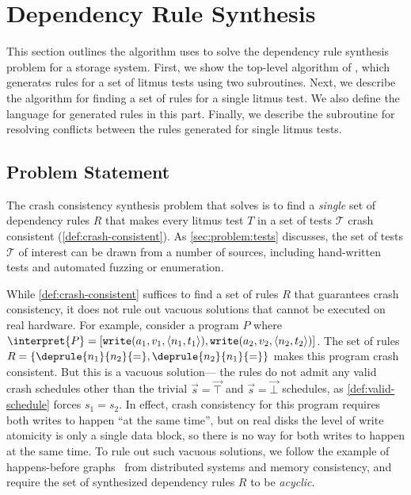 
\section{Dependency Rule Synthesis}
\label{s:algorithm}


This section outlines the algorithm \depsynth uses to solve the dependency rule
synthesis problem for a storage system.
First, we show the top-level algorithm of \depsynth, which generates rules
for a set of litmus tests using two subroutines.
Next, we describe the algorithm for finding a set of rules for a single litmus test.
We also define the language for generated rules in this part.
Finally, we describe the subroutine for resolving conflicts between the rules
generated for single litmus tests.

\subsection{Problem Statement}

The crash consistency synthesis problem
that \depsynth solves
is to find a \emph{single} set of dependency rules $R$
that makes every litmus test $T$
in a set of tests $\mathcal{T}$
crash consistent (\cref{def:crash-consistent}).
As \cref{sec:problem:tests} discusses,
the set of tests $\mathcal{T}$ of interest
can be drawn from a number of sources,
including hand-written tests
and automated fuzzing or enumeration.

While \cref{def:crash-consistent} suffices to find a set of rules $R$
that guarantees crash consistency,
it does not rule out vacuous solutions that cannot be executed on real hardware.
For example, consider a program $P$
where $\interpret{P} = [\texttt{write}(a_1, v_1, \langle n_1, t_1 \rangle), \texttt{write}(a_2, v_2, \langle n_2, t_2 \rangle)]$.
The set of rules $R = \{ \deprule{n_1}{n_2}{=}, \deprule{n_2}{n_1}{=} \}$
makes this program crash consistent.
But this is a vacuous solution---%
the rules do not admit any valid crash schedules
other than the trivial $\vec{s} = \vec{\top}$ and $\vec{s} = \vec{\bot}$ schedules,
as \cref{def:valid-schedule} forces $s_1 = s_2$.
In effect, crash consistency for this program
requires both writes to happen ``at the same time'',
but on real disks the level of write atomicity is only a single data block,
so there is no way for both writes to happen at the same time.
To rule out such vacuous solutions,
we follow the example of happens-before graphs~\cite{lamport:happens-before}
from distributed systems and memory consistency,
and require the set of synthesized dependency rules $R$ to be \emph{acyclic}.

